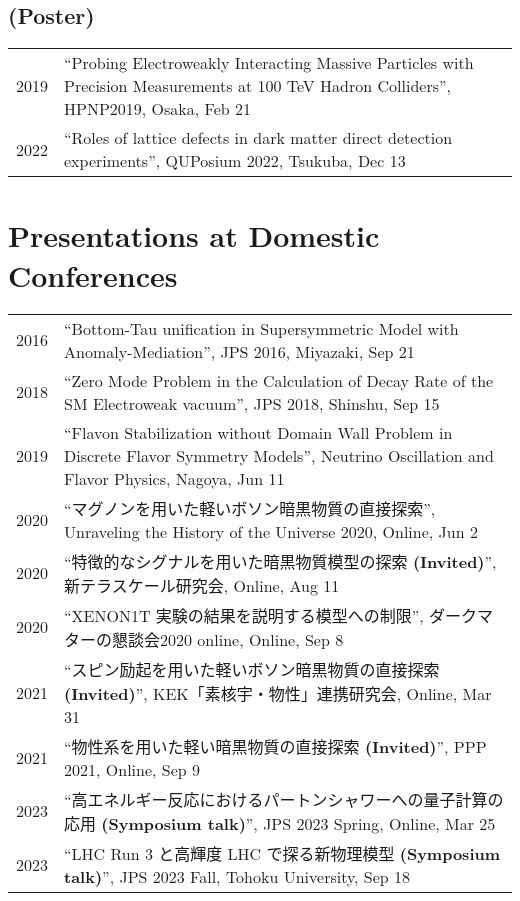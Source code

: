 \documentclass[12pt]{article}
\begin{document}
\subsection*{(Poster)}
\begin{table}[H]\begin{tabular}{lp{6in}}2019 & ``Probing Electroweakly Interacting Massive Particles with Precision Measurements at 100 TeV Hadron Colliders'', HPNP2019, Osaka, Feb 21 \\2022 & ``Roles of lattice defects in dark matter direct detection experiments'', QUPosium 2022, Tsukuba, Dec 13 \\\end{tabular}\end{table}

\section*{Presentations at Domestic Conferences}
\begin{table}[H]\begin{tabular}{lp{6in}}2016 & ``Bottom-Tau unification in Supersymmetric Model with Anomaly-Mediation'', JPS 2016, Miyazaki, Sep 21 \\2018 & ``Zero Mode Problem in the Calculation of Decay Rate of the SM Electroweak vacuum'', JPS 2018, Shinshu, Sep 15 \\2019 & ``Flavon Stabilization without Domain Wall Problem in Discrete Flavor Symmetry Models'', Neutrino Oscillation and Flavor Physics, Nagoya, Jun 11 \\2020 & ``マグノンを用いた軽いボソン暗黒物質の直接探索'', Unraveling the History of the Universe 2020, Online, Jun 2 \\2020 & ``特徴的なシグナルを用いた暗黒物質模型の探索 \textbf{(Invited)}'', 新テラスケール研究会, Online, Aug 11 \\2020 & ``XENON1T 実験の結果を説明する模型への制限'', ダークマターの懇談会2020 online, Online, Sep 8 \\2021 & ``スピン励起を用いた軽いボソン暗黒物質の直接探索 \textbf{(Invited)}'', KEK「素核宇・物性」連携研究会, Online, Mar 31 \\2021 & ``物性系を用いた軽い暗黒物質の直接探索 \textbf{(Invited)}'', PPP 2021, Online, Sep 9 \\2023 & ``高エネルギー反応におけるパートンシャワーへの量子計算の応用 \textbf{(Symposium talk)}'', JPS 2023 Spring, Online, Mar 25 \\2023 & ``LHC Run 3 と高輝度 LHC で探る新物理模型 \textbf{(Symposium talk)}'', JPS 2023 Fall, Tohoku University, Sep 18 \\\end{tabular}\end{table}
\end{document}
